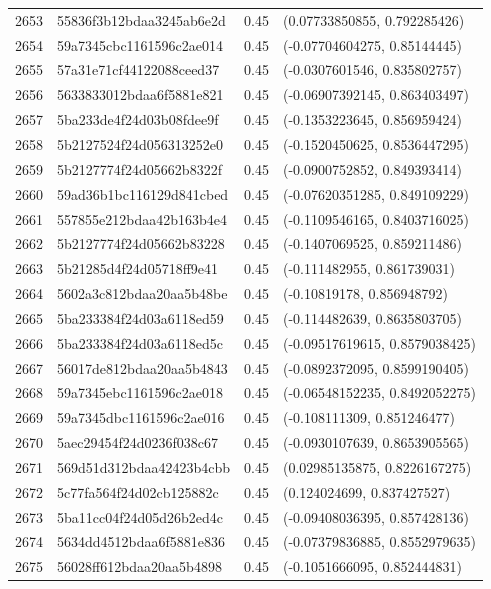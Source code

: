 \begin{table}[ht]
\begin{tabular}{rlrl}
  2653 & 55836f3b12bdaa3245ab6e2d & 0.45 & (0.07733850855, 0.792285426) \\ 
  2654 & 59a7345cbc1161596c2ae014 & 0.45 & (-0.07704604275, 0.85144445) \\ 
  2655 & 57a31e71cf44122088ceed37 & 0.45 & (-0.0307601546, 0.835802757) \\ 
  2656 & 5633833012bdaa6f5881e821 & 0.45 & (-0.06907392145, 0.863403497) \\ 
  2657 & 5ba233de4f24d03b08fdee9f & 0.45 & (-0.1353223645, 0.856959424) \\ 
  2658 & 5b2127524f24d056313252e0 & 0.45 & (-0.1520450625, 0.8536447295) \\ 
  2659 & 5b2127774f24d05662b8322f & 0.45 & (-0.0900752852, 0.849393414) \\ 
  2660 & 59ad36b1bc116129d841cbed & 0.45 & (-0.07620351285, 0.849109229) \\ 
  2661 & 557855e212bdaa42b163b4e4 & 0.45 & (-0.1109546165, 0.8403716025) \\ 
  2662 & 5b2127774f24d05662b83228 & 0.45 & (-0.1407069525, 0.859211486) \\ 
  2663 & 5b21285d4f24d05718ff9e41 & 0.45 & (-0.111482955, 0.861739031) \\ 
  2664 & 5602a3c812bdaa20aa5b48be & 0.45 & (-0.10819178, 0.856948792) \\ 
  2665 & 5ba233384f24d03a6118ed59 & 0.45 & (-0.114482639, 0.8635803705) \\ 
  2666 & 5ba233384f24d03a6118ed5c & 0.45 & (-0.09517619615, 0.8579038425) \\ 
  2667 & 56017de812bdaa20aa5b4843 & 0.45 & (-0.0892372095, 0.8599190405) \\ 
  2668 & 59a7345ebc1161596c2ae018 & 0.45 & (-0.06548152235, 0.8492052275) \\ 
  2669 & 59a7345dbc1161596c2ae016 & 0.45 & (-0.108111309, 0.851246477) \\ 
  2670 & 5aec29454f24d0236f038c67 & 0.45 & (-0.0930107639, 0.8653905565) \\ 
  2671 & 569d51d312bdaa42423b4cbb & 0.45 & (0.02985135875, 0.8226167275) \\ 
  2672 & 5c77fa564f24d02cb125882c & 0.45 & (0.124024699, 0.837427527) \\ 
  2673 & 5ba11cc04f24d05d26b2ed4c & 0.45 & (-0.09408036395, 0.857428136) \\ 
  2674 & 5634dd4512bdaa6f5881e836 & 0.45 & (-0.07379836885, 0.8552979635) \\ 
  2675 & 56028ff612bdaa20aa5b4898 & 0.45 & (-0.1051666095, 0.852444831) \\ 

\end{tabular}
\end{table}
